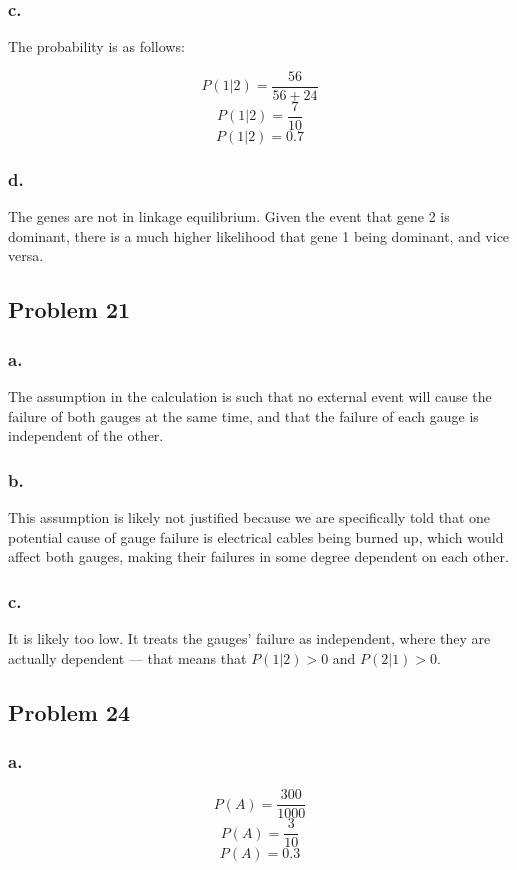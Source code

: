 \documentclass[11pt]{article}
\begin{document}
\subsubsection*{c.}
The probability is as follows:

\[ P(1|2) = \frac{56}{56+24} \]
\[ P(1|2) = \frac{7}{10} \]
\[ P(1|2) = 0.7 \]

\subsubsection*{d.}
The genes are not in linkage equilibrium. Given the event that gene 2 is
dominant, there is a much higher likelihood that gene 1 being dominant, and vice
versa. 

\subsection*{Problem 21}
\subsubsection*{a.}
The assumption in the calculation is such that no external event will cause the
failure of both gauges at the same time, and that the failure of each gauge is
independent of the other. 

\subsubsection*{b.}
This assumption is likely not justified because we are specifically told that one 
potential cause of gauge failure is electrical cables being burned up, which
would affect both gauges, making their failures in some degree dependent on each
other. 

\subsubsection*{c.}
It is likely too low. It treats the gauges' failure as independent, where they
are actually dependent --- that means that $P(1|2) > 0$ and $P(2|1) > 0$. 

\subsection*{Problem 24}
\subsubsection*{a.}
\[ P(A) = \frac{300}{1000} \]
\[ P(A) = \frac{3}{10} \]
\[ P(A) = 0.3 \]
\end{document}
